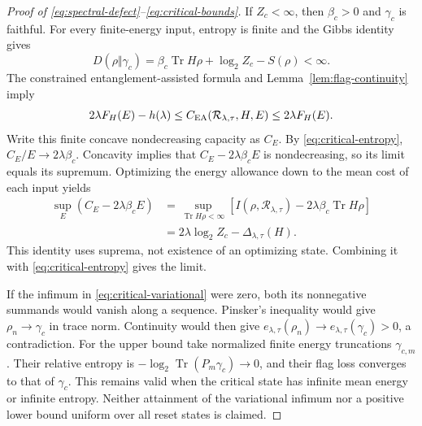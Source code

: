 \documentclass[11pt]{article}
\newcommand{\Tr}{\operatorname{Tr}}
\newcommand{\Rcal}{\mathcal R_{\lambda,\tau}}
\begin{document}
\begin{proof}[Proof of \eqref{eq:spectral-defect}--\eqref{eq:critical-bounds}]
If $Z_c<\infty$, then $\beta_c>0$ and $\gamma_c$ is faithful.
For every finite-energy input, entropy is finite and the Gibbs
identity gives
\[
 D(\rho\Vert\gamma_c)
   =\beta_c\Tr H\rho+\log_2 Z_c-S(\rho)<\infty.
\]
The constrained entanglement-assisted formula \cite[Theorem 1]{hs}
and Lemma~\ref{lem:flag-continuity} imply
\[
 2\lambda F_H(E)-h(\lambda)
 \le C_{\rm EA}(\Rcal,H,E)\le2\lambda F_H(E).
\]
Write this finite concave nondecreasing capacity as $C_E$. By
\eqref{eq:critical-entropy}, $C_E/E\to2\lambda\beta_c$.
Concavity implies that $C_E-2\lambda\beta_c E$ is nondecreasing,
so its limit equals its supremum. Optimizing the energy allowance
down to the mean cost of each input yields
\begin{align*}
 \sup_E(C_E-2\lambda\beta_c E)
 &=\sup_{\Tr H\rho<\infty}
       [I(\rho,\Rcal)-2\lambda\beta_c\Tr H\rho]\\
 &=2\lambda\log_2 Z_c-\Delta_{\lambda,\tau}(H).
\end{align*}
This identity uses suprema, not existence of an optimizing state.
Combining it with \eqref{eq:critical-entropy} gives the limit.

If the infimum in \eqref{eq:critical-variational} were zero,
both its nonnegative summands would vanish along a sequence.
Pinsker's inequality would give $\rho_n\to\gamma_c$ in trace
norm. Continuity would then give
$e_{\lambda,\tau}(\rho_n)\to e_{\lambda,\tau}(\gamma_c)>0$,
a contradiction. For the upper bound take normalized finite
energy truncations $\gamma_{c,m}$. Their relative entropy is
$-\log_2\Tr(P_m\gamma_c)\to0$, and their flag loss converges
to that of $\gamma_c$. This remains valid when the critical
state has infinite mean energy or infinite entropy. Neither
attainment of the variational infimum nor a positive lower bound
uniform over all reset states is claimed.
\end{proof}
\end{document}
